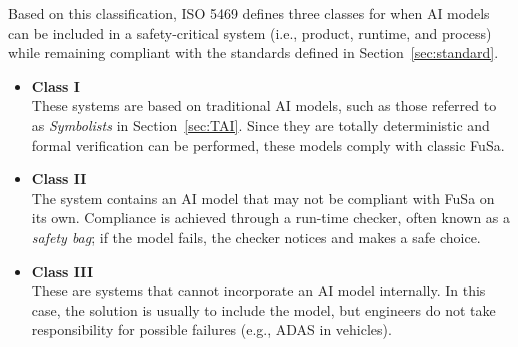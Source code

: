 \myskip

Based on this classification, ISO 5469 defines three classes for when AI models can be included in a safety-critical system (i.e., product, runtime, and process) while remaining compliant with the standards defined in Section~\ref{sec:standard}.
\begin{itemize}
    \item \textbf{Class I} \\
        These systems are based on traditional AI models, such as those referred to as \textit{Symbolists} in Section~\ref{sec:TAI}. Since they are totally deterministic and formal verification can be performed, these models comply with classic FuSa.
    \item \textbf{Class II} \\
        The system contains an AI model that may not be compliant with FuSa on its own. Compliance is achieved through a run-time checker, often known as a \textit{safety bag}; if the model fails, the checker notices and makes a safe choice.
    \item \textbf{Class III} \\
        These are systems that cannot incorporate an AI model internally. In this case, the solution is usually to include the model, but engineers do not take responsibility for possible failures (e.g., ADAS in vehicles).
\end{itemize}